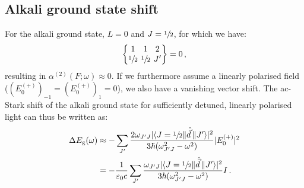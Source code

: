 \documentclass[../Thesis-IJspeert.tex]{subfiles}
\begin{document}
\subsection{Alkali ground state shift}
\label{alkaligroundstateshift}
For the alkali ground state, $L=0$ and $J=\sfrac{1}{2}$, for which we have:
\begin{align}
\tj{1}{1}{2}{\sfrac{1}{2}}{\sfrac{1}{2}}{J'}=0\,,
\end{align}
resulting in $\alpha^{(2)}(F ; \omega) \approx 0$. If we furthermore assume a linearly polarised field ($(E_0^{(+)})_{-1} = (E_0^{(+)})_{1}=0$), we also have a vanishing vector shift. The ac-Stark shift of the alkali ground state for sufficiently detuned, linearly polarised light can thus be written as:
\begin{align}
\label{groundstatestark}
\begin{split}
\Delta E_\mathrm{g}\left(\omega\right) &\approx - \sum_{J'} \frac{2 \omega_{J' J}\lvert \langle J=\sfrac{1}{2} \| \hat{\vec{d}}\, \| J'\rangle\rvert ^2}{3 \hbar\left(\omega_{J' J}^2-\omega^2\right)} \lvert E_0^{(+)}\rvert ^2 \\&= -\frac{1}{\varepsilon_0 c} \sum_{J'} \frac{\omega_{J' J}\lvert \langle J=\sfrac{1}{2} \| \hat{\vec{d}}\, \| J'\rangle\rvert ^2}{3 \hbar\left(\omega_{J' J}^2-\omega^2\right)} I \,.
\end{split}
\end{align}
\end{document}
